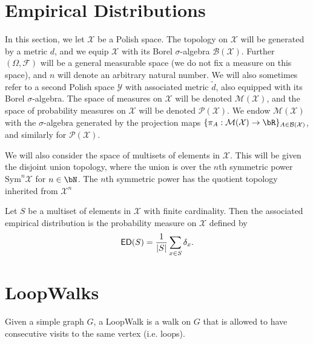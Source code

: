 
\chapter{Empirical Distributions}

In this section, we let $\mathcal{X}$ be a Polish space. The topology on $\mathcal{X}$ will be generated by a metric $d$,
and we equip $\mathcal{X}$ with its Borel $\sigma$-algebra $\mathcal{B}(\mathcal{X})$. Further $(\Omega, \mathcal{F})$
will be a general measurable space (we do not fix a measure on this space), and $n$ will denote an arbitrary natural number.
We will also sometimes refer to a second Polish space $\mathcal{Y}$ with associated metric $\tilde d$, also equipped with
its Borel $\sigma$-algebra. The space of measures on $\mathcal{X}$ will be denoted $\mathcal{M}(\mathcal{X})$, and the
space of probability measures on $\mathcal{X}$ will be denoted $\mathcal{P}(\mathcal{X})$. We endow $\mathcal{M}(\mathcal{X})$
with the $\sigma$-algebra generated by the projection maps $\{\pi_{A} : \mathcal{M}(\mathcal{X}) \to \bR\}_{A \in \mathcal{B}(\mathcal{X})}$,
and similarly for $\mathcal{P}(\mathcal{X})$.

We will also consider the space of multisets of elements in $\mathcal{X}$. This will be given the disjoint union topology, where
the union is over the $n$th symmetric power $\mathrm{Sym}^n \mathcal{X}$ for $n \in \bN$. The $n$th symmetric power has the quotient
topology inherited from $\mathcal{X}^n$



\begin{definition}
  \label{def:empiricalDistribution}
  \uses{}
  \notready
  Let $S$ be a multiset of elements in $\mathcal{X}$ with finite cardinality. Then the associated empirical distribution is the probability measure on $\mathcal{X}$ defined by
  \[
  {\sf ED}(S) = \frac{1}{|S|}\sum_{x \in S} \delta_{x}.
  \]
\end{definition}


\chapter{LoopWalks}


\begin{definition}
  \label{def:loop_walk}
  \leanok
  Given a simple graph $G$, a LoopWalk is a walk on $G$ that is allowed to have consecutive visits
  to the same vertex (i.e. loops).
\end{definition}


